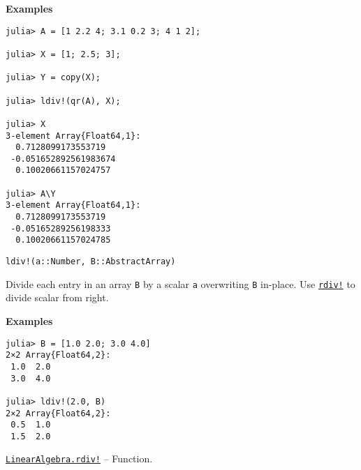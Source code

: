 \begin{adjustwidth}{2em}{0pt}
\textbf{Examples}


\begin{verbatim}
julia> A = [1 2.2 4; 3.1 0.2 3; 4 1 2];

julia> X = [1; 2.5; 3];

julia> Y = copy(X);

julia> ldiv!(qr(A), X);

julia> X
3-element Array{Float64,1}:
  0.7128099173553719
 -0.051652892561983674
  0.10020661157024757

julia> A\Y
3-element Array{Float64,1}:
  0.7128099173553719
 -0.05165289256198333
  0.10020661157024785
\end{verbatim}




\begin{lstlisting}
ldiv!(a::Number, B::AbstractArray)
\end{lstlisting}

Divide each entry in an array \texttt{B} by a scalar \texttt{a} overwriting \texttt{B} in-place.  Use \hyperlink{14949618513077509248}{\texttt{rdiv!}} to divide scalar from right.

\textbf{Examples}


\begin{verbatim}
julia> B = [1.0 2.0; 3.0 4.0]
2×2 Array{Float64,2}:
 1.0  2.0
 3.0  4.0

julia> ldiv!(2.0, B)
2×2 Array{Float64,2}:
 0.5  1.0
 1.5  2.0
\end{verbatim}



\end{adjustwidth}
\hypertarget{14949618513077509248}{} 
\hyperlink{14949618513077509248}{\texttt{LinearAlgebra.rdiv!}}  -- {Function.}

